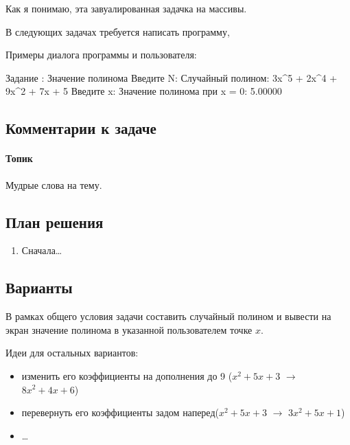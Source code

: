 
Как я понимаю, эта завуалированная задачка на массивы.

В следующих задачах требуется написать программу, 

Примеры диалога программы и пользователя:

\begin{zzoutput}
  Задание : Значение полинома
  Введите N: 
  Случайный полином: 3x^5 + 2x^4 + 9x^2 + 7x + 5
  Введите x: 
  Значение полинома при x = 0: 5.00000
\end{zzoutput}


\subsection*{Комментарии к задаче}

\paragraph{Топик}
Мудрые слова на тему.


\subsection*{План решения}


\begin{enumerate}
\item Сначала\dots
\end{enumerate}


\subsection*{Варианты}

\begin{zztask}
В рамках общего условия задачи составить случайный полином и вывести на экран
значение полинома в указанной пользователем точке $x$.
\end{zztask}

Идеи для остальных вариантов:

\begin{itemize}
\item изменить его коэффициенты на дополнения до 9 ($x^2+5x+3$ $\rightarrow$ $8x^2+4x+6$)
\item перевернуть его коэффициенты задом наперед($x^2+5x+3$ $\rightarrow$ $3x^2+5x+1$)
\item \dots
\end{itemize}
